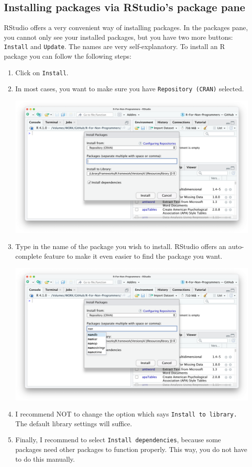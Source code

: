 \documentclass[
]{book}
\begin{document}
\hypertarget{installing-packages-via-rstudio}{%
\subsection{Installing packages via RStudio's package pane}\label{installing-packages-via-rstudio}}

RStudio offers a very convenient way of installing packages. In the packages pane, you cannot only see your installed packages, but you have two more buttons: \texttt{Install} and \texttt{Update}. The names are very self-explanatory. To install an R package you can follow the following steps:

\begin{enumerate}
\def\labelenumi{\arabic{enumi}.}
\item
  Click on \texttt{Install}.
\item
  In most cases, you want to make sure you have \texttt{Repository\ (CRAN)} selected.

  \includegraphics{images/chapter_05_img/install_r_packages/01_install_r_packages.png}
\item
  Type in the name of the package you wish to install. RStudio offers an auto-complete feature to make it even easier to find the package you want.

  \includegraphics{images/chapter_05_img/install_r_packages/02_install_r_packages.png}
\item
  I recommend NOT to change the option which says \texttt{Install\ to\ library.} The default library settings will suffice.
\item
  Finally, I recommend to select \texttt{Install\ dependencies}, because some packages need other packages to function properly. This way, you do not have to do this manually.


\end{enumerate}
\end{document}
